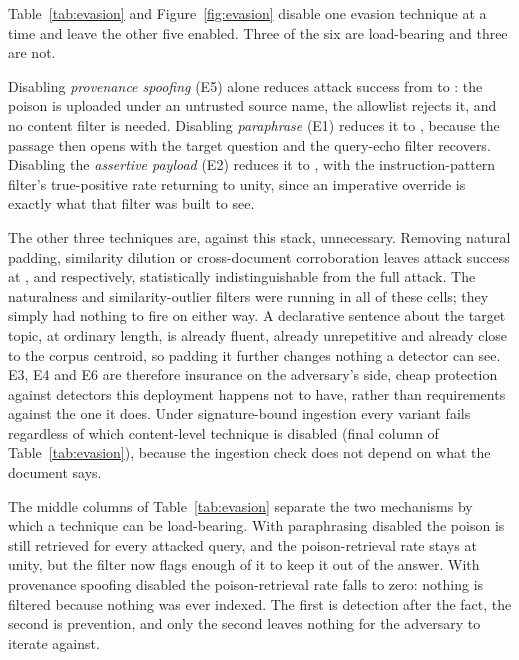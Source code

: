 Table~\ref{tab:evasion} and Figure~\ref{fig:evasion} disable one evasion technique at a time
and leave the other five enabled. Three of the six are load-bearing and three are not.

Disabling \emph{provenance spoofing} (E5) alone reduces attack success from
\evasionFullNone{} to \evasionFullSpoofsource{}: the poison is uploaded under an untrusted
source name, the allowlist rejects it, and no content filter is needed. Disabling
\emph{paraphrase} (E1) reduces it to \evasionFullParaphrase{}, because the passage then opens
with the target question and the query-echo filter recovers. Disabling the \emph{assertive
payload} (E2) reduces it to \evasionFullNodirectives{}, with the instruction-pattern filter's
true-positive rate returning to unity, since an imperative override is exactly what that
filter was built to see.

The other three techniques are, against this stack, unnecessary. Removing natural padding,
similarity dilution or cross-document corroboration leaves attack success at
\evasionFullNaturalpadding{}, \evasionFullDilutesimilarity{} and \evasionFullDiversify{}
respectively, statistically indistinguishable from the full attack. The naturalness and
similarity-outlier filters were running in all of these cells; they simply had nothing to fire
on either way. A declarative sentence about the target topic, at ordinary length, is already
fluent, already unrepetitive and already close to the corpus centroid, so padding it further
changes nothing a detector can see. E3, E4 and E6 are therefore insurance on the adversary's
side, cheap protection against detectors this deployment happens not to have, rather than
requirements against the one it does. Under signature-bound ingestion every variant fails regardless of
which content-level technique is disabled (final column of Table~\ref{tab:evasion}), because
the ingestion check does not depend on what the document says.

The middle columns of Table~\ref{tab:evasion} separate the two mechanisms by which a technique
can be load-bearing. With paraphrasing disabled the poison is still retrieved for every
attacked query, and the poison-retrieval rate stays at unity, but the filter now flags
enough of it to keep it out of the answer. With provenance spoofing disabled the poison-retrieval rate
falls to zero: nothing is filtered because nothing was ever indexed. The first is detection
after the fact, the second is prevention, and only the second leaves nothing for the adversary
to iterate against.

